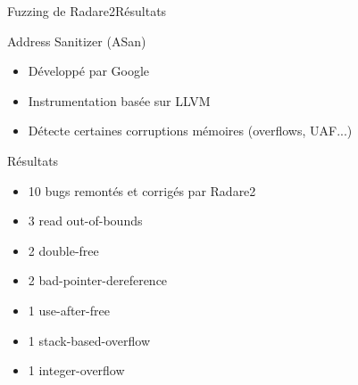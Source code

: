 \begin{frame}{Fuzzing de Radare2}{Résultats}
  \begin{exampleblock}{Address Sanitizer (ASan)}
    \begin{itemize}
    \item{Développé par Google}
    \item{Instrumentation basée sur LLVM}
    \item{Détecte certaines corruptions mémoires (overflows, UAF...)}
    \end{itemize}
  \end{exampleblock}

  \begin{block}{Résultats}
    \begin{itemize}
    \item{10 bugs remontés et corrigés par Radare2}
    \item{3 read out-of-bounds}
    \item{2 double-free}
    \item{2 bad-pointer-dereference}
    \item{1 use-after-free}
    \item{1 stack-based-overflow}
    \item{1 integer-overflow}
    \end{itemize}
  \end{block}
\end{frame}
